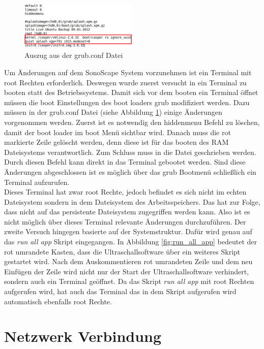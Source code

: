 \begin{figure}
\centering  	
\includegraphics[width=0.5\textwidth]{Sonoscape_Analyse/grub_conf} 
		\caption{{\small Auszug aus der grub.conf Datei}}
		\label{fig:grub_conf}
\end{figure}
Um Änderungen auf dem SonoScape System vorzunehmen ist ein Terminal mit root Rechten erforderlich. Deswegen wurde zuerst versucht in ein Terminal zu booten statt des Betriebssystems. Damit sich vor dem booten ein Terminal öffnet müssen die boot Einstellungen des boot loaders grub modifiziert werden. Dazu müssen in der grub.conf Datei (siehe Abbildung \ref{fig:grub_conf}) einige Änderungen vorgenommen werden. Zuerst ist es notwendig den hiddenmenu Befehl zu löschen, damit der boot loader im boot Menü sichtbar wird.
Danach muss die rot markierte Zeile gelöscht werden, denn diese ist für das booten des RAM Dateisystems verantwortlich. Zum Schluss muss 
 in die Datei geschrieben werden. Durch diesen Befehl kann direkt in das Terminal gebootet werden. Sind diese Änderungen abgeschlossen ist es möglich über das grub Bootmenü schließlich ein Terminal aufzurufen.\\
Dieses Terminal hat zwar root Rechte, jedoch befindet es sich nicht im echten Dateisystem sondern in dem Dateisystem des Arbeitsspeichers. Das hat zur Folge, dass nicht auf das persistente Dateisystem zugegriffen werden kann. Also ist es nicht möglich über dieses Terminal relevante Änderungen durchzuführen.
Der zweite Versuch hingegen basierte auf der Systemstruktur. Dafür wird genau auf das \textit{run all app} Skript eingegangen. In Abbildung \ref{fig:run_all_app} bedeutet der rot umrandete Kasten, dass die Ultraschallsoftware über ein weiteres Skript gestartet wird. Nach dem Auskommentieren rot umrandeten Zeile und dem neu Einfügen der Zeile  wird nicht nur der Start der Ultraschallsoftware verhindert, sondern auch ein Terminal geöffnet. Da das Skript \textit{run all app} mit root Rechten aufgerufen wird, hat auch das Terminal das in dem Skript aufgerufen wird automatisch ebenfalls root Rechte.

\section{Netzwerk Verbindung}


